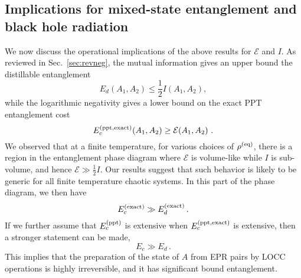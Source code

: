 \documentclass[a4paper,11pt]{article}
\newcommand\half{{\ensuremath{\frac{1}{2}}}}
\newcommand{\be}{\begin{equation}}
\newcommand{\ee}{\end{equation}}
\newcommand\ha{{\half}}
\newcommand\sE{{\ensuremath{{\mathcal E}}}}
\begin{document}
\begin{enumerate}





\section{Implications for mixed-state entanglement and black hole radiation} \label{sec:mixen}


We now discuss the operational implications of the above results for $\sE$ and $I$. 
As reviewed in Sec.~\ref{sec:revneg}, the mutual information gives an upper bound the distillable entanglement 
\be
E_d (A_1, A_2) \leq \ha I (A_1, A_2) \label{m_ed} , 
\ee
while the logarithmic negativity gives a lower bound on the exact PPT entanglement cost %
\be 
 E_c^{\rm (ppt, exact)}(A_1, A_2) \geq \sE(A_1, A_2) \ .
 \label{e_ec}
\ee 
We observed that at a finite temperature, for various choices of $\rho^{(\rm eq)}$, there is a region in the entanglement phase diagram where $\sE$ is volume-like while $I$ is sub-volume, and hence $\sE \gg \frac{1}{2}I$. Our results suggest that such behavior is likely to be generic for all finite temperature chaotic systems. In this part of the phase diagram, we then have 
\be 
E_c^{\rm (exact)} \gg E_d^{\rm (exact)}\, . 
\ee
If we further assume that $E_c^{\rm (ppt)}$ is extensive when $E_c^{\rm (ppt, exact)}$ is extensive, then a stronger statement 
can be made, 
\be 
E_c \gg E_d \, . \label{cd} 
\ee
This implies that the preparation of the state of $A$ from EPR pairs by LOCC operations is highly irreversible, and it has significant bound entanglement.


\end{enumerate}
\end{document}

